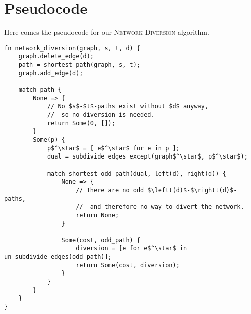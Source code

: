 \section{Pseudocode}
Here comes the pseudocode for our \textsc{Network Diversion} algorithm.

\begin{lstlisting}[caption={Main},label=Listing,mathescape=true]
fn network_diversion(graph, s, t, d) {
    graph.delete_edge(d);
    path = shortest_path(graph, s, t);
    graph.add_edge(d);

    match path {
        None => {
            // No $s$-$t$-paths exist without $d$ anyway,
            //  so no diversion is needed.
            return Some(0, []);
        }
        Some(p) {
            p$^\star$ = [ e$^\star$ for e in p ];
            dual = subdivide_edges_except(graph$^\star$, p$^\star$);

            match shortest_odd_path(dual, left(d), right(d)) {
                None => {
                    // There are no odd $\leftt(d)$-$\rightt(d)$-paths,
                    //  and therefore no way to divert the network.
                    return None;
                }
                
                Some(cost, odd_path) {
                    diversion = [e for e$^\star$ in un_subdivide_edges(odd_path)];
                    return Some(cost, diversion);
                }
            }
        }
    }
}
\end{lstlisting}
